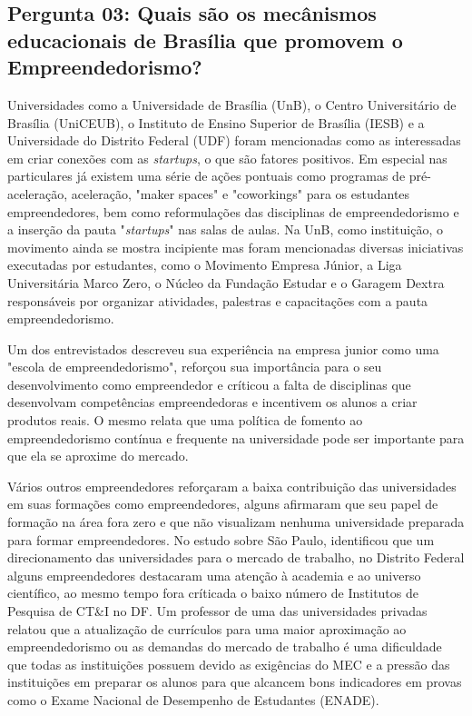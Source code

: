 \subsection*{Pergunta 03: Quais são os mecânismos educacionais de Brasília que promovem o Empreendedorismo?}
\label{subsection:pergunta_de_pesquisa_3}

Universidades como a Universidade de Brasília (UnB), o Centro Universitário de Brasília (UniCEUB), o Instituto de Ensino Superior de Brasília (IESB) e a Universidade do Distrito Federal (UDF) foram mencionadas como as  interessadas em criar conexões com as \textit{startups}, o que são fatores positivos. Em especial nas particulares já existem uma série de ações pontuais como programas de pré-aceleração, aceleração, "maker spaces" e "coworkings" para os estudantes empreendedores, bem como reformulações das disciplinas de empreendedorismo e a inserção da pauta "\textit{startups}" nas salas de aulas. Na UnB, como instituição, o movimento ainda se mostra incipiente mas foram mencionadas diversas iniciativas executadas por estudantes, como o Movimento Empresa Júnior, a Liga Universitária Marco Zero, o Núcleo da Fundação Estudar e o Garagem Dextra responsáveis por organizar atividades, palestras e capacitações com a pauta empreendedorismo. 

Um dos entrevistados descreveu sua experiência na empresa junior como uma "escola de empreendedorismo", reforçou sua importância para o seu desenvolvimento como empreendedor e críticou a falta de disciplinas que desenvolvam competências empreendedoras e incentivem os alunos a criar produtos reais. O mesmo relata que uma política de fomento ao empreendedorismo contínua e frequente na universidade pode ser importante para que ela se aproxime do mercado. 

Vários outros empreendedores reforçaram a baixa contribuição das universidades em suas formações como empreendedores, alguns afirmaram que seu papel de formação na área fora zero e que não visualizam nenhuma universidade preparada para formar empreendedores. No estudo sobre São Paulo,  identificou que um direcionamento das universidades para o mercado de trabalho, no Distrito Federal alguns empreendedores destacaram uma atenção à academia e ao universo científico, ao mesmo tempo fora críticada o baixo número de Institutos de Pesquisa de CT\&I no DF. Um professor de uma das universidades privadas relatou que a atualização de currículos para uma maior aproximação ao empreendedorismo ou as demandas do mercado de trabalho é uma dificuldade que todas as instituições possuem devido as exigências do MEC e a pressão das instituições em preparar os alunos para que alcancem bons indicadores em provas como o Exame Nacional de Desempenho de Estudantes (ENADE). 

